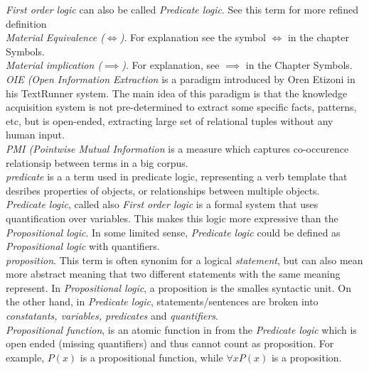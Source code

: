 \emph {First order logic} can also be called \emph{Predicate logic}. See this
term for more refined definition\\

\emph{Material Equivalence ($\iff$)}. For explanation see the symbol $\iff$ in the
chapter Symbols.\\

\emph{Material implication ($\implies$)}. For explanation, see $\implies$ in the
Chapter Symbols.\\

\emph{OIE (Open Information Extraction} is a paradigm introduced by Oren Etizoni
in his TextRunner system. The main idea of this paradigm is that the knowledge 
acquisition system is not pre-determined to extract some specific facts, 
patterns, etc, but is open-ended, extracting large set of relational tuples 
without any human input.\\

\emph{PMI (Pointwise Mutual Information} is a measure which captures 
co-occurence relationsip between terms in a big corpus.\\

\emph{predicate} is a a term used in predicate logic, representing a verb
template that desribes properties of objects, or relationships between multiple
objects.\\

\emph{Predicate logic}, called also \emph{First order logic} is a formal system
that uses quantification over variables. This makes this logic more expressive
than the \emph{Propositional logic}. In some limited sense, 
\emph{Predicate logic} could be defined as \emph{Propositional logic} with 
quantifiers.\\

\emph{proposition}. This term is often synonim for a logical \emph{statement},
but can also mean more abstract meaning that two different statements with the
same meaning represent. In \emph{Propositional logic}, a proposition is the
smalles syntactic unit. On the other hand, in \emph{Predicate logic}, 
statements/sentences are broken into \emph{constatants, variables, predicates}
and \emph{quantifiers}.\\

\emph{Propositional function}, is an atomic function in from the 
\emph{Predicate logic} which is open ended (missing quantifiers) and thus
cannot count as proposition. For example, $P(x)$ is a propositional function,
while $\forall x P(x)$ is a proposition.\\

